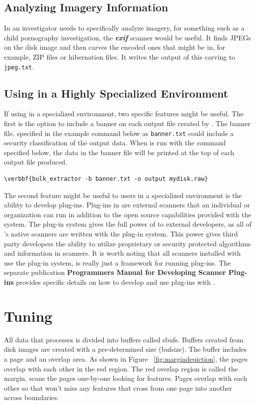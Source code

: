 \documentclass[11pt]{article} %
\begin{document}
\subsection{Analyzing Imagery Information}
\label{imagery}
In an investigator needs to specifically analyze imagery, for something such as a child pornography investigation, the \textbf{\textit{exif}} scanner would be useful. It finds JPEGs on the disk image and then carves the encoded ones that might be in, for example, ZIP files or hibernation files. It writes the output of this carving to \texttt{jpeg.txt}.

\subsection{Using \bulk in a Highly Specialized Environment}
If using \bulk in a specialized environment, two specific features might be useful.  The first is the option to include a banner on each output file created by \bulk. The banner file, specified in the example command below as \texttt{banner.txt} could include a security classification of the output data. When \bulk is run with the command specified below, the data in the banner file will be printed at the top of each output file produced.
\begin{Verbatim}[commandchars=\\\{\}]
\verbbf{bulk_extractor -b banner.txt -o output mydisk.raw}
\end{Verbatim}

The second feature might be useful to users in a specialized environment is the ability to develop plug-ins. Plug-ins in \bulk are external scanners that an individual or organization can run in addition to the open source capabilities provided with the \bulk system. The plug-in system gives the full power of \bulk to external developers, as all of \bulk's native scanners are written with the plug-in system. This power gives third party developers the ability to utilize proprietary or security protected algorithms and information in \bulk scanners. It is worth noting that all scanners installed with \bulk use the plug-in system, \bulk is really just a framework for running plug-ins.  The separate publication \textbf{Programmers Manual for Developing Scanner Plug-ins} \cite{programmersmanual} provides specific details on how to develop and use plug-ins with \bulk.

\section{Tuning \bulk}
All data that \bulk processes is divided into buffers called sbufs. Buffers created from disk images are created with a pre-determined size (bufsize). The buffer includes a page and an overlap area. As shown in Figure ~\ref{fig:margindepiction}, the pages overlap with each other in the red region. The red overlap region is called the margin. \bulk scans the pages one-by-one looking for features. Pages overlap with each other so that \bulk won't miss any features that cross from one page into another across boundaries.\\
\end{document}
